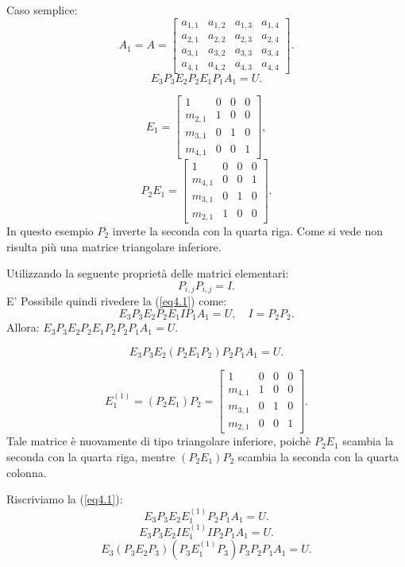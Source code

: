 \begin{exe}
Caso semplice:
\[
A_1 = A =
\left[\begin{array}{cccc}
a_{1,1} & a_{1,2} & a_{1,3} & a_{1,4} \\
a_{2,1} & a_{2,2} & a_{2,3} & a_{2,4} \\
a_{3,1} & a_{3,2} & a_{3,3} & a_{3,4} \\
a_{4,1} & a_{4,2} & a_{4,3} & a_{4,4}
\end{array}\right].
\]
\begin{equation}\label{eq4.1}E_3P_3E_2P_2E_1P_1A_1 = U.\end{equation}

\[E_1 =
\left[\begin{array}{ccccc}
1      & 0 & 0 &  0 \\
m_{2,1} & 1 & 0 &  0 \\
m_{3,1} & 0 & 1 &  0 \\
m_{4,1} & 0 & 0 &  1
\end{array}\right],
\]
\[P_2E_1 =
\left[\begin{array}{ccccc}
1      & 0 & 0 &  0 \\
m_{4,1} & 0 & 0 &  1 \\
m_{3,1} & 0 & 1 &  0 \\
m_{2,1} & 1 & 0 &  0
\end{array}\right].
\]
In questo esempio $P_2$ inverte la seconda con la quarta riga. Come si vede
non risulta più una matrice triangolare inferiore.
\end{exe}

Utilizzando la seguente proprietà delle matrici elementari:
\[P_{i,j}P_{i,j} = I.\]
E' Possibile quindi rivedere la (\ref{eq4.1}) come:
\[E_3P_3E_2P_2E_1IP_1A_1 = U, \quad I = P_2P_2.\]
Allora: $E_3P_3E_2P_2E_1P_2P_2P_1A_1 = U.$

\[
E_3P_3E_2(P_2E_1P_2)P_2P_1A_1 = U.
\]

\[E_1^{(1)} = (P_2E_1)P_2 =
\left[\begin{array}{ccccc}
1      & 0 & 0 &  0 \\
m_{4,1} & 1 & 0 &  0 \\
m_{3,1} & 0 & 1 &  0 \\
m_{2,1} & 0 & 0 &  1
\end{array}\right].
\]
Tale matrice è nuovamente di tipo triangolare inferiore, poichè $P_2E_1$
scambia la seconda con la quarta riga, mentre $(P_2E_1)P_2$ scambia la seconda
con la quarta colonna.

Riscriviamo la (\ref{eq4.1}):
\[E_3P_3E_2E_1^{(1)}P_2P_1A_1 = U.\]
\[E_3P_3E_2IE_1^{(1)}IP_2P_1A_1 = U.\]
\[E_3(P_3E_2P_3)(P_3E_1^{(1)}P_3)P_3P_2P_1A_1 = U.\]

